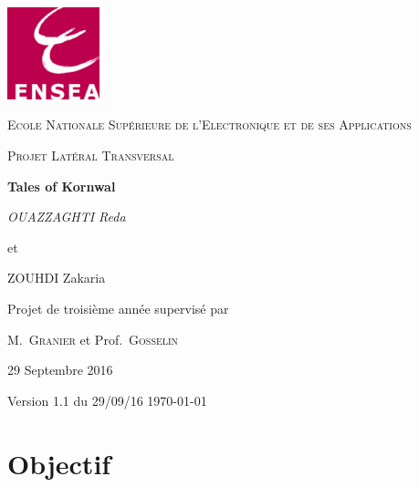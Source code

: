 \documentclass[12pt,a4paper]{report}
\begin{document}
\begin{titlepage}


	\centering
	\includegraphics[width=0.20\textwidth]{ensea.png}\par\vspace{1cm}
	{\scshape\LARGE Ecole Nationale Supérieure de l'Electronique et de ses Applications \par}
	\vspace{1cm}
	{\scshape\Large Projet Latéral Transversal\par}
	\vspace{1.5cm}
	{\huge\bfseries Tales of Kornwal\par}
	\vspace{2cm}
	{\Large\itshape OUAZZAGHTI Reda\par et\par ZOUHDI Zakaria\par}
	\vfill
	Projet de troisième année supervisé par\par
	M.~\textsc{Granier} et Prof.~\textsc{Gosselin}

	\vfill

	{\large 29 Septembre 2016\par \tiny \begin{flushleft}
	Version 1.1 du 29/09/16 \today
\end{flushleft}	 }

\end{titlepage}

\tableofcontents
    \chapter{Objectif}
\end{document}
